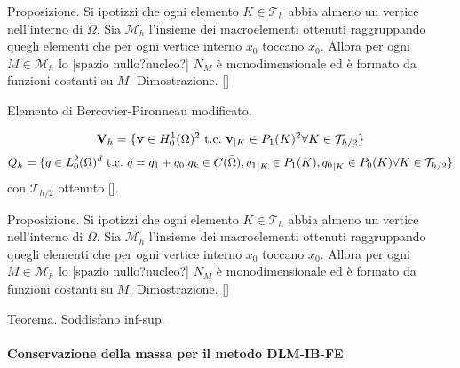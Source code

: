 Proposizione. Si ipotizzi che ogni elemento $ K\in\mathcal{T}_h$ abbia almeno un vertice nell'interno di $\Omega$. Sia $\mathcal{M}_h$ l'insieme dei macroelementi ottenuti raggruppando quegli elementi che per ogni vertice interno $x_0$ toccano $x_0$. Allora per ogni $M\in\mathcal{M}_h$ lo [spazio nullo?nucleo?] $N_M$ è monodimensionale ed è formato da funzioni costanti su $M$.
Dimostrazione. []

Elemento di Bercovier-Pironneau modificato.

$$\mathbf{V}_h=\{\mathbf{v}\in H^1_0(\Omega)^2\ \text{t.c.}\ \mathbf{v}_{\vert K}\in P_{1}(K)^2\forall K\in\mathcal{T}_{h/2} \}$$
$$Q_h=\{ q\in L^2_0(\Omega)^d\ \text{t.c.}\  q=q_1+q_0. q_k\in C(\bar{\Omega}),{q_1}_{\vert K}\in P_1(K), {q_0}_{\vert K}\in P_0(K)\forall K\in\mathcal{T}_{h/2} \}$$
con $\mathcal{T}_{h/2}$ ottenuto []. 

Proposizione. Si ipotizzi che ogni elemento $ K\in\mathcal{T}_h$ abbia almeno un vertice nell'interno di $\Omega$. Sia $\mathcal{M}_h$ l'insieme dei macroelementi ottenuti raggruppando quegli elementi che per ogni vertice interno $x_0$ toccano $x_0$. Allora per ogni $M\in\mathcal{M}_h$ lo [spazio nullo?nucleo?] $N_M$ è monodimensionale ed è formato da funzioni costanti su $M$.
Dimostrazione. []

Teorema. Soddisfano inf-sup.

\paragraph{Conservazione della massa per il metodo DLM-IB-FE}

